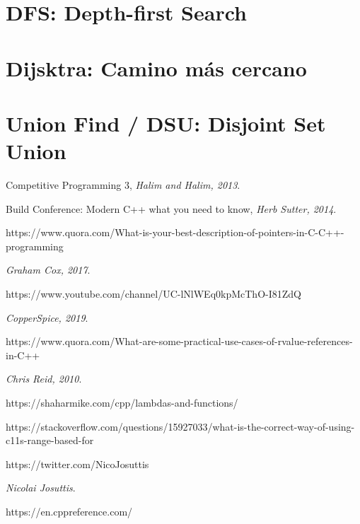 \documentclass[12pt, fleqn]{report}                             %
\theoremstyle{break}                                            %
\begin{document}
        \section{DFS: Depth-first Search}

        \section{Dijsktra: Camino más cercano}

        \clearpage
        \section{Union Find / DSU: Disjoint Set Union}




\begin{thebibliography}{10}

        Competitive Programming 3,
        \textit{Halim and Halim, 2013}. 


        Build Conference: Modern C++ what you need to know,
        \textit{Herb Sutter, 2014}. 

        https://www.quora.com/What-is-your-best-description-of-pointers-in-C-C++-programming

        \textit{Graham Cox, 2017}. 

        https://www.youtube.com/channel/UC-lNlWEq0kpMcThO-I81ZdQ

        \textit{CopperSpice, 2019}. 

        https://www.quora.com/What-are-some-practical-use-cases-of-rvalue-references-in-C++

        \textit{Chris Reid, 2010}. 

        https://shaharmike.com/cpp/lambdas-and-functions/

        https://stackoverflow.com/questions/15927033/what-is-the-correct-way-of-using-c11s-range-based-for

        https://twitter.com/NicoJosuttis
        
        \textit{Nicolai Josuttis}. 

        https://en.cppreference.com/


\end{thebibliography}
\end{document}
